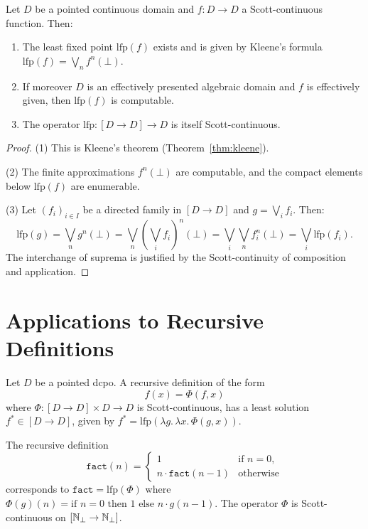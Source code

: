 \begin{theorem}
\label{thm:lfp-domain}
Let $D$ be a pointed continuous domain and $f\colon D \to D$ a Scott-continuous function.
Then:
\begin{enumerate}
  \item The least fixed point $\mathrm{lfp}(f)$ exists and is given by Kleene's formula
    $\mathrm{lfp}(f) = \bigvee_n f^n(\bot)$.
  \item If moreover $D$ is an effectively presented algebraic domain and $f$ is
    effectively given, then $\mathrm{lfp}(f)$ is computable.
  \item The operator $\mathrm{lfp}\colon [D \to D] \to D$ is itself Scott-continuous.
\end{enumerate}
\end{theorem}

\begin{proof}
(1) This is Kleene's theorem (Theorem~\ref{thm:kleene}).

(2) The finite approximations $f^n(\bot)$ are computable, and the compact elements below
$\mathrm{lfp}(f)$ are enumerable.

(3) Let $(f_i)_{i \in I}$ be a directed family in $[D \to D]$ and $g = \bigvee_i f_i$.
Then:
\[
  \mathrm{lfp}(g) = \bigvee_n g^n(\bot) = \bigvee_n \left(\bigvee_i f_i\right)^n(\bot)
  = \bigvee_i \bigvee_n f_i^n(\bot) = \bigvee_i \mathrm{lfp}(f_i).
\]
The interchange of suprema is justified by the Scott-continuity of composition and
application.
\end{proof}

\section{Applications to Recursive Definitions}

\begin{proposition}
Let $D$ be a pointed dcpo. A recursive definition of the form
\[
  f(x) = \Phi(f, x)
\]
where $\Phi\colon [D \to D] \times D \to D$ is Scott-continuous, has a least solution
$f^* \in [D \to D]$, given by
$f^* = \mathrm{lfp}(\lambda g.\, \lambda x.\, \Phi(g,x))$.
\end{proposition}

\begin{example}[Factorial]
The recursive definition
\[
  \mathtt{fact}(n) = \begin{cases} 1 & \text{if } n = 0, \\ n \cdot \mathtt{fact}(n-1) & \text{otherwise} \end{cases}
\]
corresponds to $\mathtt{fact} = \mathrm{lfp}(\Phi)$ where
$\Phi(g)(n) = \text{if } n = 0 \text{ then } 1 \text{ else } n \cdot g(n-1)$. The
operator $\Phi$ is Scott-continuous on $[\mathbb{N}_\bot \to \mathbb{N}_\bot]$.
\end{example}

